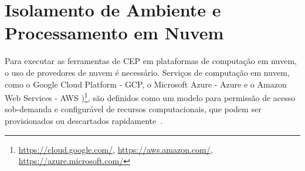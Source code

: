 \section{Isolamento de Ambiente e Processamento em Nuvem}
\label{sec:cloudtools}

Para executar as ferramentas de CEP em plataformas de computação em nuvem, o uso de provedores de nuvem é necessário. Serviços de computação em nuvem, como o Google Cloud Platform - GCP, o Microsoft Azure - Azure e o Amazon Web Services - AWS )\footnote{\url{https://cloud.google.com/},  \url{https://aws.amazon.com/}, \url{https://azure.microsoft.com/}}, são definidos como um modelo para permissão de acesso sob-demanda e configurável de recursos computacionais, que podem ser provisionados ou descartados rapidamente~\citep{CLoudComputing}. 











